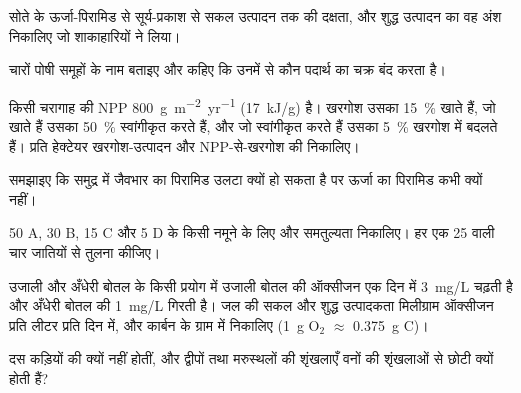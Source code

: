 \begin{exercise}[$\star$]\label{exo:b1:ecosystem-organization:3}
सोते के ऊर्जा-पिरामिड से सूर्य-प्रकाश से सकल उत्पादन तक की दक्षता, और
शुद्ध उत्पादन का वह अंश निकालिए जो शाकाहारियों ने लिया।
\end{exercise}

\begin{exercise}[$\star$]\label{exo:b1:ecosystem-organization:4}
चारों पोषी समूहों के नाम बताइए और कहिए कि उनमें से कौन पदार्थ का चक्र
बंद करता है।
\end{exercise}

\begin{exercise}[$\star\star$]\label{exo:b1:ecosystem-organization:5}
किसी चरागाह की NPP \qty{800}{g.m^{-2}.yr^{-1}} (\qty{17}{kJ/g}) है।
खरगोश उसका \qty{15}{\%} खाते हैं, जो खाते हैं उसका \qty{50}{\%}
स्वांगीकृत करते हैं, और जो स्वांगीकृत करते हैं उसका \qty{5}{\%} खरगोश
में बदलते हैं। प्रति हेक्टेयर खरगोश-उत्पादन और NPP-से-खरगोश की  निकालिए।
\end{exercise}

\begin{exercise}[$\star\star$]\label{exo:b1:ecosystem-organization:6}
समझाइए कि समुद्र में जैवभार का पिरामिड उलटा क्यों हो सकता है पर ऊर्जा का
पिरामिड कभी क्यों नहीं।
\end{exercise}

\begin{exercise}[$\star\star$]\label{exo:b1:ecosystem-organization:7}
50 A, 30 B, 15 C और 5 D के किसी नमूने के लिए  और समतुल्यता
निकालिए। हर एक 25 वाली चार जातियों से तुलना कीजिए।
\end{exercise}

\begin{exercise}[$\star\star$]\label{exo:b1:ecosystem-organization:8}
उजाली और अँधेरी बोतल के किसी प्रयोग में उजाली बोतल की ऑक्सीजन एक दिन में
\qty{3}{mg/L} चढ़ती है और अँधेरी बोतल की \qty{1}{mg/L} गिरती है। जल की
सकल और शुद्ध उत्पादकता मिलीग्राम ऑक्सीजन प्रति लीटर प्रति दिन में, और
कार्बन के ग्राम में निकालिए (\qty{1}{g} $\mathrm{O_2}$ $\approx$
\qty{0.375}{g} C)।
\end{exercise}

\begin{exercise}[$\star\star$]\label{exo:b1:ecosystem-organization:9}
दस कड़ियों की  क्यों नहीं होतीं, और द्वीपों तथा मरुस्थलों की
शृंखलाएँ वनों की शृंखलाओं से छोटी क्यों होती हैं?
\end{exercise}

